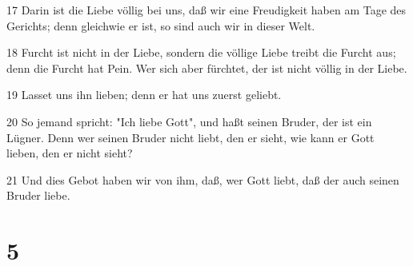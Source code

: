\par 17 Darin ist die Liebe völlig bei uns, daß wir eine Freudigkeit haben am Tage des Gerichts; denn gleichwie er ist, so sind auch wir in dieser Welt.
\par 18 Furcht ist nicht in der Liebe, sondern die völlige Liebe treibt die Furcht aus; denn die Furcht hat Pein. Wer sich aber fürchtet, der ist nicht völlig in der Liebe.
\par 19 Lasset uns ihn lieben; denn er hat uns zuerst geliebt.
\par 20 So jemand spricht: "Ich liebe Gott", und haßt seinen Bruder, der ist ein Lügner. Denn wer seinen Bruder nicht liebt, den er sieht, wie kann er Gott lieben, den er nicht sieht?
\par 21 Und dies Gebot haben wir von ihm, daß, wer Gott liebt, daß der auch seinen Bruder liebe.

\chapter{5}

